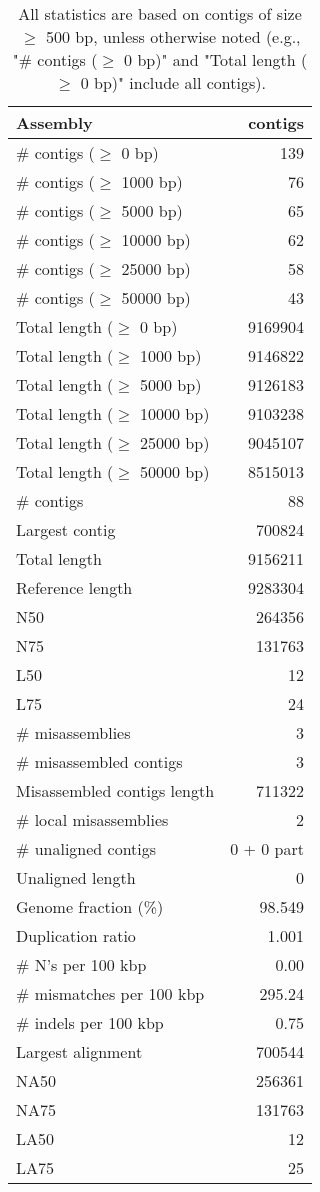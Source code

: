 \documentclass[12pt,a4paper]{article}
\begin{document}
\begin{table}[ht]
\begin{center}
\caption{All statistics are based on contigs of size $\geq$ 500 bp, unless otherwise noted (e.g., "\# contigs ($\geq$ 0 bp)" and "Total length ($\geq$ 0 bp)" include all contigs).}
\begin{tabular}{|l*{1}{|r}|}
\hline
Assembly & contigs \\ \hline
\# contigs ($\geq$ 0 bp) & 139 \\ \hline
\# contigs ($\geq$ 1000 bp) & 76 \\ \hline
\# contigs ($\geq$ 5000 bp) & 65 \\ \hline
\# contigs ($\geq$ 10000 bp) & 62 \\ \hline
\# contigs ($\geq$ 25000 bp) & 58 \\ \hline
\# contigs ($\geq$ 50000 bp) & 43 \\ \hline
Total length ($\geq$ 0 bp) & 9169904 \\ \hline
Total length ($\geq$ 1000 bp) & 9146822 \\ \hline
Total length ($\geq$ 5000 bp) & 9126183 \\ \hline
Total length ($\geq$ 10000 bp) & 9103238 \\ \hline
Total length ($\geq$ 25000 bp) & 9045107 \\ \hline
Total length ($\geq$ 50000 bp) & 8515013 \\ \hline
\# contigs & 88 \\ \hline
Largest contig & 700824 \\ \hline
Total length & 9156211 \\ \hline
Reference length & 9283304 \\ \hline
N50 & 264356 \\ \hline
N75 & 131763 \\ \hline
L50 & 12 \\ \hline
L75 & 24 \\ \hline
\# misassemblies & 3 \\ \hline
\# misassembled contigs & 3 \\ \hline
Misassembled contigs length & 711322 \\ \hline
\# local misassemblies & 2 \\ \hline
\# unaligned contigs & 0 + 0 part \\ \hline
Unaligned length & 0 \\ \hline
Genome fraction (\%) & 98.549 \\ \hline
Duplication ratio & 1.001 \\ \hline
\# N's per 100 kbp & 0.00 \\ \hline
\# mismatches per 100 kbp & 295.24 \\ \hline
\# indels per 100 kbp & 0.75 \\ \hline
Largest alignment & 700544 \\ \hline
NA50 & 256361 \\ \hline
NA75 & 131763 \\ \hline
LA50 & 12 \\ \hline
LA75 & 25 \\ \hline
\end{tabular}
\end{center}
\end{table}
\end{document}
